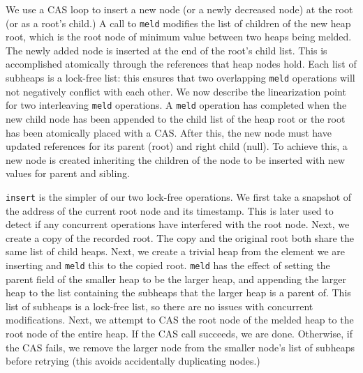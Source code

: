 \documentclass{acm_proc_article-sp}
\begin{document}

We use a CAS loop to insert a new node (or a newly decreased node)
at the root (or as a root's child.) A call to \texttt{meld} modifies the list of children of the new heap root,
which is the root node of minimum value between two heaps being melded. The newly added node is inserted at
the end of the root's child list. This is accomplished atomically through the references that heap nodes
hold. Each list of subheaps is a lock-free list: this ensures that two overlapping \texttt{meld}
operations will not negatively conflict with each other. We now describe the linearization point
for two interleaving \texttt{meld} operations. A \texttt{meld} operation has completed when the
new child node has been appended to the child list of the heap root or the root has been atomically
placed with a CAS. After this, the new node must have updated references for its parent (root) and
right child (null). To achieve this, a new node is created inheriting the children of the node to be
inserted with new values for parent and sibling. 

\texttt{insert} is the simpler of our two lock-free operations. We
first take a snapshot of the address of the current
root node and its timestamp. This is later used to detect if any
concurrent operations
have interfered with the root node. Next, we create a copy of the recorded
root. The copy and the original root both share the same list of child heaps.
Next, we create a trivial heap from the element we are inserting and \texttt{meld} this
to the copied root. \texttt{meld} has the effect of setting the parent field of the smaller
heap to be the larger heap, and appending the larger heap to the list containing the subheaps
that the larger heap is a parent of. This list of subheaps is a lock-free list, so there are no
issues with concurrent modifications. Next, we attempt to CAS the root node of the melded heap
to the root node of the entire heap. If the CAS call succeeds, we are done. Otherwise,
if the CAS fails, we remove
the larger node from the smaller node's list of subheaps before retrying (this avoids accidentally duplicating nodes.)
\end{document}
